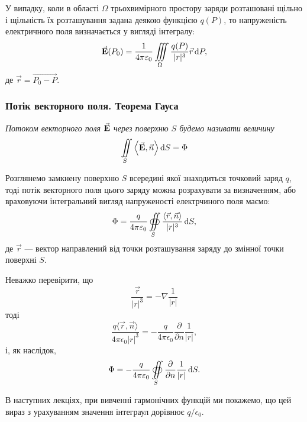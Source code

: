 У випадку, коли в області $\Omega$ трьохвимірного простору заряди розташовані щільно і щільність їх розташування задана деякою функцією $q(P)$, то напруженість електричного поля визначається у вигляді інтегралу:
\begin{equation}
	{\vec{\mathbf{E}}}(P_0) = \frac{1}{4 \pi \varepsilon_0} \displaystyle\iiint\limits_\Omega \frac{q(P)}{|r|^3} \vec r \mathop{}\!\mathrm{d} P,
\end{equation}
де $\vec r =\overrightarrow{ P_0 - P}$.

\subsubsection{Потік векторного поля. Теорема Гауса}

\begin{definition}
	\it{Потоком векторного поля} ${\vec{\mathbf{E}}}$ через поверхню $S$ будемо називати величину
	\begin{equation}
		\Iint_S \langle \vecf E, \vec n \rangle \diff S = \Phi
	\end{equation}
\end{definition}

Розглянемо замкнену поверхню $S$ всередині якої знаходиться точковий заряд $q$, тоді потік векторного поля цього заряду можна розрахувати за визначенням, або враховуючи інтегральний вигляд напруженості електрчиного поля маємо:
\begin{equation}
	\Phi = \frac{q}{4 \pi\epsilon_0} \Oiint_S \frac{\langle \vec r, \vec n\rangle}{|r|^3} \diff S,
\end{equation}
де $\vec r$ --- вектор направлений від точки розташування заряду до змінної точки поверхні $S$. \medskip

Неважко перевірити, що
\begin{equation}
	\frac{\vec r}{|r|^3} = - \nabla \frac{1}{|r|}
\end{equation}
тоді
\begin{equation}
	\frac{q\langle \vec r,\vec n\rangle}{4 \pi \epsilon_0 |r|^3} = - \frac{q}{4 \pi \epsilon_0} \frac{\partial}{\partial n} \frac{1}{|r|},
\end{equation}
і, як наслідок,
\begin{equation}
	\Phi = - \frac{q}{4 \pi \varepsilon_0} \displaystyle\oiint\limits_S \frac{\partial}{\partial n} \frac{1}{|r|} \mathop{}\!\mathrm{d} S.
\end{equation}

В наступних лекціях, при вивченні гармонічних функцій ми покажемо, що цей вираз з урахуванням значення інтеграул дорівнює  $q / \epsilon_0$. \medskip

